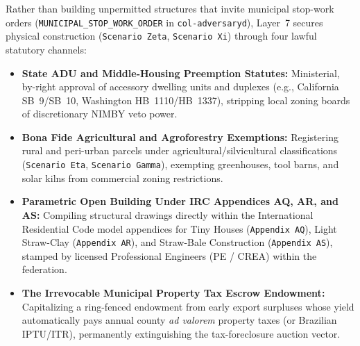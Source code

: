 Rather than building unpermitted structures that invite municipal stop-work orders (\texttt{MUNICIPAL\_STOP\_WORK\_ORDER} in \texttt{col-adversaryd}), Layer~7 secures physical construction (\texttt{Scenario Zeta}, \texttt{Scenario Xi}) through four lawful statutory channels:
\begin{itemize}
    \item \textbf{State ADU and Middle-Housing Preemption Statutes:} Ministerial, by-right approval of accessory dwelling units and duplexes (e.g., California SB~9/SB~10, Washington HB~1110/HB~1337), stripping local zoning boards of discretionary NIMBY veto power.
    \item \textbf{Bona Fide Agricultural and Agroforestry Exemptions:} Registering rural and peri-urban parcels under agricultural/silvicultural classifications (\texttt{Scenario Eta}, \texttt{Scenario Gamma}), exempting greenhouses, tool barns, and solar kilns from commercial zoning restrictions.
    \item \textbf{Parametric Open Building Under IRC Appendices AQ, AR, and AS:} Compiling structural drawings directly within the International Residential Code model appendices for Tiny Houses (\texttt{Appendix~AQ}), Light Straw-Clay (\texttt{Appendix~AR}), and Straw-Bale Construction (\texttt{Appendix~AS}), stamped by licensed Professional Engineers (PE / CREA) within the federation.
    \item \textbf{The Irrevocable Municipal Property Tax Escrow Endowment:} Capitalizing a ring-fenced endowment from early export surpluses whose yield automatically pays annual county \textit{ad valorem} property taxes (or Brazilian IPTU/ITR), permanently extinguishing the tax-foreclosure auction vector.
\end{itemize}
